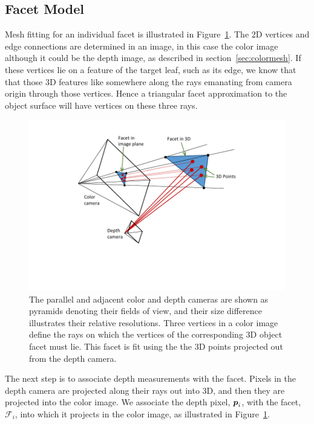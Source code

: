 \subsection{Facet Model}

Mesh fitting for an individual facet is illustrated in Figure~\ref{fig:facet}.  The $2$D vertices and edge connections are determined in an image, in this case the color image although it could be the depth image, as described in section~\ref{sec:colormesh}.  If these vertices lie on a feature of the target leaf, such as its edge, we know that that those $3$D features like somewhere along the rays emanating from camera origin through those vertices.  Hence a triangular facet approximation to the object surface will have vertices on these three rays.  

\begin{figure}
\begin{center}
   \includegraphics[trim=80 70 70 20,clip,width=0.95\linewidth]{Figures/pointFittingConcept}
\end{center}
   \caption{The parallel and adjacent color and depth cameras are shown as pyramids denoting their fields of view, and their size difference illustrates their relative resolutions.  Three vertices in a color image define the rays on which the vertices of the corresponding $3$D object facet must lie.  This facet is fit using the the $3$D points projected out from the depth camera.}
\label{fig:facet}
\end{figure}

The next step is to associate depth measurements with the facet.  Pixels in the depth camera are projected along their rays out into $3$D, and then they are projected into the color image.  We associate the depth pixel, $\boldsymbol{p}_i$, with the facet, $\mathcal{F}_i$, into which it projects in the color image, as illustrated in Figure~\ref{fig:facet}. 

